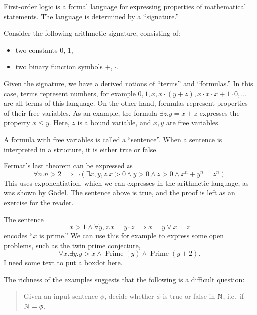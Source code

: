 
First-order logic is a formal language for expressing properties of mathematical
statements.
The language is determined by a \enquote{signature.}

\begin{example}
  Consider the following arithmetic signature, consisting of:
  \begin{itemize}
  \item two constants $0$, $1$,
  \item two binary function symbols $+$, $\cdot$.
  \end{itemize}
  Given the signature, we have a derived notions of \enquote{terms} and
  \enquote{formulas.}
  In this case, terms represent numbers, for example $0, 1, x, x \cdot (y+z),
  x \cdot x \cdot x + 1 \cdot 0, \ldots$ are all terms of this language.
  On the other hand, formulas represent properties of their free variables.
  As an example, the formula $\exists z. y = x + z$ expresses the property $x
  \le y$.
  Here, $z$ is a bound variable, and $x, y$ are free variables.
  \boxdot{}
\end{example}

A formula with free variables is called a \enquote{sentence}.
When a sentence is interpreted in a structure, it is either true or false.

\begin{example}
  Fermat's last theorem can be expressed as
  \[
	\forall n. n > 2 \implies \lnot \left(
	  \exists x, y, z. x > 0 \land y > 0 \land z > 0
	  \land x^n + y^n = z^n
	\right)
  \]
  This uses exponentiation, which we can expresses in the arithmetic language,
  as was shown by Gödel.
  The sentence above is true, and the proof is left as an exercise for the
  reader.
  \boxdot{}
\end{example}

\begin{example}
  The sentence
  \[
	x > 1 \land \forall y, z . x = y \cdot z \implies x = y \lor x = z
  \]
  encodes \enquote{$x$ is prime.}
  We can use this for example to express some open problems, such as the twin
  prime conjecture,
  \[
	\forall x . \exists y. y > x \land \operatorname{Prime}(y) \land
	\operatorname{Prime}(y+2).
  \]
  I need some text to put a boxdot here.
  \boxdot{}
\end{example}

The richness of the examples suggests that the following is a difficult
question:
\begin{quote}
  Given an input sentence $\phi$, decide whether $\phi$ is true or false in
  $\mathbb{N}$, i.e.~if $\mathbb{N} \models \phi$.
\end{quote}

